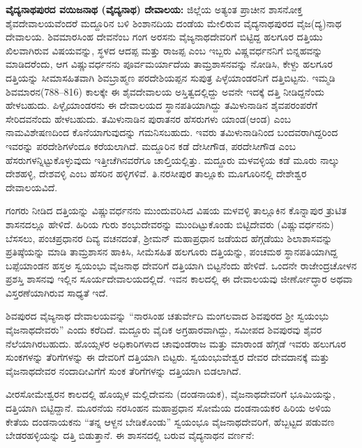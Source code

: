 \textbf{ವೈದ್ಯನಾಥಪುರದ ವಯಿಜನಾಥ (ವೈದ್ಯನಾಥ) ದೇವಾಲಯ: } ಜಿಲ್ಲೆಯ ಅತ್ಯಂತ ಪ್ರಾಚೀನ ಶಾಸನೋಕ್ತ ಶೈವದೇವಾಲಯವೆಂದರೆ ಮದ್ದೂರಿನ ಬಳಿ ಶಿಂಶಾನದಿಯ ದಂಡೆಯ ಮೇಲಿರುವ ವೈದ್ಯನಾಥಪುರದ ವೈಜ(ದ್ಯ)ನಾಥ ದೇವಾಲಯ. ಶಿವಮಾರಸಿಂಹ ದೇವನೆಂಬ ಗಂಗ ಅರಸನು ವೈಜ್ಯನಾಥದೇವರಿಗೆ ಬಿಟ್ಟಿದ್ದ ಹಲಗೂರ ದತ್ತಿಯು ಖಿಲವಾಗಿರುವ ವಿಷಯವನ್ನು, ಸ್ಥಳದ ಆದಪ್ಪ ಮತ್ತು ರಾಜಪ್ಪ ಎಂಬ ಇಬ್ಬರು ವಿಷ್ಣವರ್ಧನನಿಗೆ ಬಿನ್ನಹವನ್ನು ಮಾಡಿದರೆಂದು, ಆಗ ವಿಷ್ಣುವರ್ಧನನು ಪೂರ್ವಮರ್ಯಾದೆಯ ತಾಮ್ರಶಾಸನವನ್ನು ನೋಡಿಸಿ, ಕೇಳ್ದು ಹಲಗೂರ ದತ್ತಿಯನ್ನು ಸೀಮಾಸಹಿತವಾಗಿ ಶಿವಬ್ರಾಹ್ಮಣ ಪರದೇಶಿಯಪ್ಪನ ಸುಪುತ್ರ ಪಿಳ್ಳೆಯಾಂಡರನಿಗೆ ದತ್ತಿಬಿಟ್ಟನು. ಇಮ್ಮಡಿ ಶಿವಮಾರನ(788–816) ಕಾಲಕ್ಕೇ ಈ ಶೈವದೇವಾಲಯ ಅಸ್ತಿತ್ವದಲ್ಲಿದ್ದು ಅವನೇ ಇದಕ್ಕೆ ದತ್ತಿ ನೀಡಿದ್ದನೆಂದು ಹೇಳಬಹುದು. ಪಿಳ್ಳೈಯಾಂಡರನು ಈ ದೇವಾಲಯದ ಸ್ಥಾನಪತಿಯಾಗಿದ್ದು ತಮಿಳುನಾಡಿನ ಶೈವಪರಂಪರೆಗೆ ಸೇರಿದವನೆಂದು ಹೇಳಬಹುದು. ತಮಿಳುನಾಡಿನ ಪುರಾತನರ ಹೆಸರುಗಳು ಯಾಂಡ(ಆಂಡ) ಎಂಬ ನಾಮವಿಶೇಷಣದಿಂದ ಕೊನೆಯಾಗುವುದನ್ನು ಗಮನಿಸಬಹುದು. ಇವರು ತಮಿಳುನಾಡಿನಿಂದ ಬಂದವರಾಗಿದ್ದರಿಂದ ಇವರನ್ನು ಪರದೇಶಿಗಳೆಂದೂ ಕರೆಯಲಾಗಿದೆ. ಮದ್ದೂರಿನ ಕಡೆ ದೇಸೀಗೌಡ, ಪರದೇಸೀಗೌಡ ಎಂಬ ಹೆಸರುಗಳನ್ನಿಟ್ಟುಕೊಳ್ಳುವುದು ಇತ್ತೀಚೆಗಿನವರೆಗೂ ಚಾಲ್ತಿಯಲ್ಲಿತ್ತು. ಮದ್ದೂರು ಮಳವಳ್ಳಿಯ ಕಡೆ ಮೂರು ನಾಲ್ಕು ದೇಶಹಳ್ಳಿ, ದೇಶವಳ್ಳಿ ಎಂಬ ಹೆಸರಿನ ಹಳ್ಳಿಗಳಿವೆ. ತಿ.ನರಸೀಪುರ ತಾಲ್ಲೂಕು ಮೂಗೂರಿನಲ್ಲಿ ದೇಶೇಶ್ವರ ದೇವಾಲಯವಿದೆ.

ಗಂಗರು ನೀಡಿದ ದತ್ತಿಯನ್ನು ವಿಷ್ಣುವರ್ಧನನು ಮುಂದುವರಿಸಿದ ವಿಷಯ ಮಳವಳ್ಳಿ ತಾಲ್ಲೂಕಿನ ಕೊನ್ನಾಪುರ ತ್ರುಟಿತ ಶಾಸನದಲ್ಲೂ ಹೇಳಿದೆ. ಹಿರಿಯ ಗುರು ಶಂಭುದೇವರನ್ನು ಮುಂದಿಟ್ಟುಕೊಂಡು ಬಿಟ್ಟಿದೇವರು (ವಿಷ್ಣುವರ್ಧನನು) ಬೆಸಸಲು, ಪಂಚಪ್ರಧಾನರ ದಿವ್ಯ ವಚನದಂತೆ, ಶ‍್ರೀಮನ್​ ಮಹಾಪ್ರಧಾನ ಜಡೆಯದ ಹೆಗ್ಗಡೆಯು ಶಿಲಾಶಾಸವನ್ನು ಪ್ರತಿಷ್ಠೆಯನ್ನು ಮಾಡಿ ತಾಮ್ರಶಾಸನ ಹಾಕಿಸಿ, ಸೀಮೆಸಹಿತ ಹಲಗೂರು ದತ್ತಿಯನ್ನು, ಪಂಚಮಠ ಸ್ಥಾನಪತಿಯಾಗಿದ್ದ ಬಪ್ಪೆಯಾಂಡನ ಹಸ್ತಅ ಸ್ವಯಂಭು ವೈಜನಾಥ ದೇವರಿಗೆ ದತ್ತಿಯಾಗಿ ಬಿಟ್ಟನೆಂದು ಹೇಳಿದೆ. ಒಂದನೇ ರಾಜೇಂದ್ರಚೋಳನ ಪ್ರಶಸ್ತಿ ಶಾಸನವು ಇಲ್ಲಿನ ಸೂರ್ಯದೇವಾಲಯದಲ್ಲಿದೆ. ಇವನ ಕಾಲದಲ್ಲಿ ಈ ದೇವಾಲಯವು ಜೀರ್ಣೋದ್ಧಾರ ಅಥವಾ ವಿಸ್ತರಣೆಯಾಗಿರುವ ಸಾಧ್ಯತೆ ಇದೆ.

ಶಿವಪುರದ ವೈಜ್ಯನಾಥ ದೇವಾಲಯವನ್ನು “ನಾರಸಿಂಹ ಚತುರ್ವೇದಿ ಮಂಗಲವಾದ ಶಿವಪುರದ ಶ‍್ರೀ ಸ್ವಯಂಭು ವೈಜನಾಥದೇವರು” ಎಂದು ಕರೆದಿದೆ. ಮದ್ದೂರು ವೈದಿಕ ಅಗ್ರಹಾರವಾಗಿದ್ದು, ಸಮೀಪದ ಶಿವಪುರವು ಶೈವರ ನೆಲೆಯಾಗಿರಬಹುದು. ಹೊಯ್ಸಳರ ಅಧಿಕಾರಿಗಳಾದ ಚಾವುಂಡರಾಜ ಮತ್ತು ಮಾರಾಂಡ ಹೆಗ್ಗಡೆ ಇವರು ಹಲುಗೂರ ಸುಂಕಗಳನ್ನು ತೆರಿಗೆಗಳನ್ನು ಈ ದೇವರಿಗೆ ದತ್ತಿಯಾಗಿ ಬಿಟ್ಟರು. ಸ್ವಯಂಭುವೇಶ್ವರ ದೇವರ ದೇವದಾನಕ್ಕೆ ಮತ್ತು ವೈಜನಾಥದೇವರ ನಂದಾದೀವಿಗೆಗೆ ಸುಂಕ ತೆರಿಗೆಗಳನ್ನು ದತ್ತಿಯಾಗಿ ಬಿಡಲಾಗಿದೆ.

ವೀರಸೋಮೇಶ್ವರನ ಕಾಲದಲ್ಲಿ ಹೊಯ್ಸಳ ಮಲ್ಲಿದೇವನು (ದಂಡನಾಯಕ), ವೈಜನಾಥದೇವರಿಗೆ ಭೂಮಿಯನ್ನು, ದತ್ತಿಯಾಗಿ ಬಿಟ್ಟಿದ್ದಾನೆ. ಮೂರನೆಯ ನರಸಿಂಹನ ಮಹಾಪ್ರಧಾನ ಸೋಮೆಯ ದಂಡನಾಯಕರ ಹಿರಿಯ ಅಳಿಯ ಕೇತೆಯ ದಂಡನಾಯಕನು “ತನ್ನ ಆಳ್ದನ ಬೇಡಿಕೊಂಡು” ಸ್ವಯಂಭೂ ವೈಜನಾಥದೇವರಿಗೆ, ಹೆಬ್ಬಟ್ಟದ ಪಡುವಣ ಬೇಡರಹಳ್ಳಿಯನ್ನು ದತ್ತಿ ಬಿಡುತ್ತಾನೆ. ಈ ಶಾಸನದಲ್ಲಿ ಬರುವ ವೈದ್ಯನಾಥನ ವರ್ಣನೆ:

